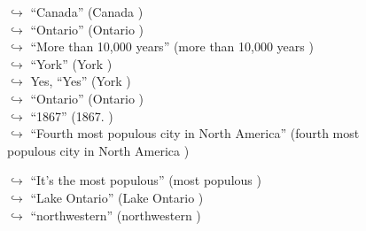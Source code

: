 \documentclass[11pt,a4paper, onecolumn]{article}
\begin{document}
\begin{figure}[t] \small \begin{tcolorbox}[boxsep=0pt,left=5pt,right=0pt,top=2pt,colback = yellow!5] \begin{dialogue}
 \small 
\colorbox{pink!25}{$\hookrightarrow$}
{ ``Canada'' (Canada ) }
\\
\colorbox{pink!25}{$\hookrightarrow$}
{ ``Ontario'' (Ontario ) }
\\
\colorbox{pink!25}{$\hookrightarrow$}
{ ``More than 10,000 years'' (more than 10,000 years ) }
\\
\colorbox{pink!25}{$\hookrightarrow$}
{ ``York'' (York ) }
\\
\colorbox{pink!25}{$\hookrightarrow$}
\colorbox{red!25}{Yes,}
{ ``Yes'' (York ) }
\\
\colorbox{pink!25}{$\hookrightarrow$}
{ ``Ontario'' (Ontario ) }
\\
\colorbox{pink!25}{$\hookrightarrow$}
{ ``1867'' (1867. ) }
\\
\colorbox{pink!25}{$\hookrightarrow$}
{ ``Fourth most populous city in North America'' (fourth most populous city in North America ) }
 \end{dialogue}\end{tcolorbox}\end{figure}\begin{figure}[t] \small \begin{tcolorbox}[boxsep=0pt,left=5pt,right=0pt,top=2pt,colback = yellow!5] \begin{dialogue}
 \small 
\colorbox{pink!25}{$\hookrightarrow$}
{ ``It's the most populous'' (most populous ) }
\\
\colorbox{pink!25}{$\hookrightarrow$}
{ ``Lake Ontario'' (Lake Ontario ) }
\\
\colorbox{pink!25}{$\hookrightarrow$}
{ ``northwestern'' (northwestern ) }
\\

\end{dialogue}
\end{tcolorbox}
\end{figure}
\end{document}
